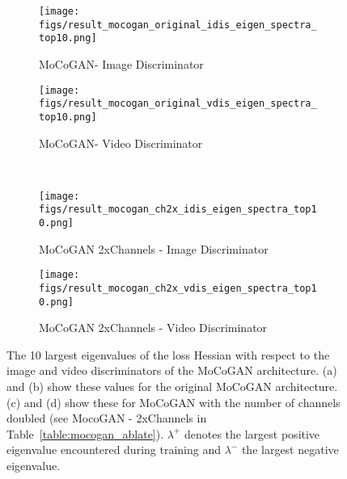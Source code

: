 \documentclass[a4paper,fleqn]{cas-sc}
\begin{document}
\begin{figure}[pos=!th]
    \centering
    \begin{subfigure}[t]{0.5\textwidth}
        \centering
        \texttt{[image: figs/result\_mocogan\_original\_idis\_eigen\_spectra\_top10.png]}
        \caption{MoCoGAN- Image Discriminator}
        \label{fig:MoCoGAN_iDis_EV}
    \end{subfigure}\begin{subfigure}[t]{0.5\textwidth}
        \centering
        \texttt{[image: figs/result\_mocogan\_original\_vdis\_eigen\_spectra\_top10.png]}
        \caption{MoCoGAN- Video
        Discriminator}
        \label{fig:MoCoGAN_vDis_EV}
    \end{subfigure}\\
    \begin{subfigure}[t]{0.5\textwidth}
        \centering
        \texttt{[image: figs/result\_mocogan\_ch2x\_idis\_eigen\_spectra\_top10.png]}
        \caption{MoCoGAN 2xChannels - Image Discriminator}
        \label{fig:MoCoGAN_iDis_2xCh_EV}
    \end{subfigure}\begin{subfigure}[t]{0.5\textwidth}
        \centering
        \texttt{[image: figs/result\_mocogan\_ch2x\_vdis\_eigen\_spectra\_top10.png]}
        \caption{MoCoGAN 2xChannels - Video Discriminator}
        \label{fig:MoCoGAN_vDis_2xCh_EV}
    \end{subfigure}
\caption{The 10 largest eigenvalues of the loss Hessian with respect to the image and video discriminators of the MoCoGAN architecture. (a) and (b) show these values for the original MoCoGAN architecture. (c) and (d) show these for MoCoGAN with the number of channels doubled (see MocoGAN - 2xChannels in Table~\ref{table:mocogan_ablate}). $\lambda^{+}$ denotes the largest positive eigenvalue encountered during training and $\lambda^{-}$ the largest negative eigenvalue.} 
    \label{fig:MoCoGAN_Dis_EV}
\end{figure}
\end{document}
